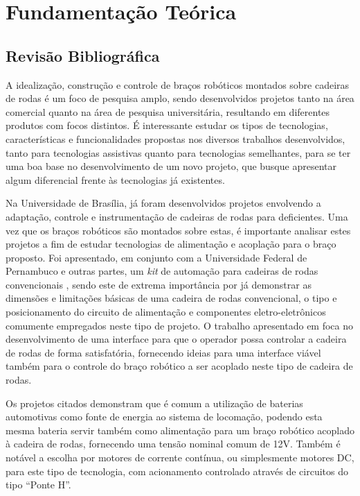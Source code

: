
\chapter{Fundamentação Teórica\label{chap:FundamentacaoMatematica}}



\section{Revisão Bibliográfica}
\label{sec:revisaobib}

A idealização, construção e controle de braços robóticos montados sobre cadeiras de rodas é um foco de pesquisa amplo, 
sendo desenvolvidos projetos tanto na área comercial quanto na área de 
pesquisa universitária, resultando em diferentes produtos com focos distintos. 
É interessante estudar os tipos de tecnologias, características e funcionalidades
propostas nos diversos trabalhos desenvolvidos, tanto para tecnologias 
assistivas quanto para tecnologias semelhantes, para se ter uma boa base
no desenvolvimento de um novo projeto, que busque apresentar algum 
diferencial frente às tecnologias já existentes.

Na Universidade de Brasília, já foram desenvolvidos projetos envolvendo a adaptação, controle e instrumentação de cadeiras de rodas para deficientes. 
Uma vez que os braços robóticos são montados sobre estas, é importante analisar estes projetos a fim de estudar tecnologias de alimentação e acoplação para o braço 
proposto. Foi apresentado, em conjunto com a Universidade Federal de Pernambuco e outras partes, um \textit{kit} de automação para cadeiras de rodas convencionais 
\cite{vidal2010desenvolvimento}, sendo este de extrema importância por já demonstrar as dimensões e limitações básicas de uma cadeira de rodas convencional, 
o tipo e posicionamento do circuito de alimentação e componentes eletro-eletrônicos comumente empregados neste tipo de projeto.
O trabalho apresentado em \cite{francisco2019interface} foca no desenvolvimento de uma interface para que o operador possa controlar a cadeira de rodas
de forma satisfatória, fornecendo ideias para uma interface viável também para o controle do braço robótico a ser acoplado neste tipo de cadeira de rodas.

Os projetos citados demonstram que é comum a utilização de baterias 
automotivas como fonte de energia ao sistema de locomação, podendo esta mesma bateria
servir também como alimentação para um braço robótico acoplado à cadeira 
de rodas, fornecendo uma tensão nominal comum de 12V.
Também é notável a escolha por motores de corrente contínua, ou simplesmente
motores DC, para este tipo de tecnologia, com acionamento controlado através de 
circuitos do tipo ``Ponte H''.


